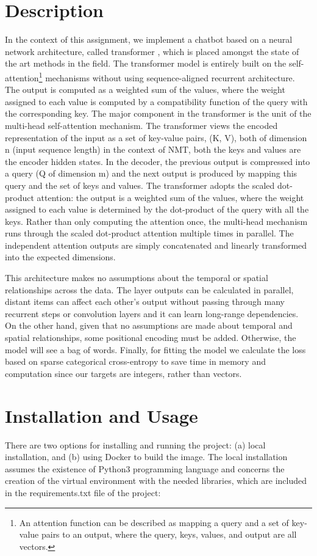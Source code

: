 \documentclass[10pt, twocolumn, a4paper]{article}
\begin{document}
\section{Description}
In the context of this assignment, we implement a chatbot based on a neural network architecture, called transformer \cite{Transformer}, which is placed amongst the state of the art methods in the field. The transformer model is entirely built on the self-attention\footnote{An attention function can be described as mapping a query and a set of key-value pairs to an output, where the query, keys, values, and output are all vectors.} mechanisms without using sequence-aligned recurrent architecture. The output is computed as a weighted sum of the values, where the weight assigned to each value is computed by a compatibility function of the query with the corresponding key. The major component in the transformer is the unit of the multi-head self-attention mechanism. The transformer views the encoded representation of the input as a set of key-value pairs, (K, V), both of dimension n (input sequence length) in the context of NMT, both the keys and values are the encoder hidden states. In the decoder, the previous output is compressed into a query (Q of dimension m) and the next output is produced by mapping this query and the set of keys and values. The transformer adopts the scaled dot-product attention: the output is a weighted sum of the values, where the weight assigned to each value is determined by the dot-product of the query with all the keys. Rather than only computing the attention once, the multi-head mechanism runs through the scaled dot-product attention multiple times in parallel. The independent attention outputs are simply concatenated and linearly transformed into the expected dimensions.

This architecture makes no assumptions about the temporal or spatial relationships across the data. The layer outputs can be calculated in parallel, distant items can affect each other’s output without passing through many recurrent steps or convolution layers and it can learn long-range dependencies. On the other hand, given that no assumptions are made about temporal and spatial relationships, some positional encoding must be added. Otherwise, the model will see a bag of words. Finally, for fitting the model we calculate the loss based on sparse categorical cross-entropy to save time in memory and computation since our targets are integers, rather than vectors.

\section{Installation and Usage}
There are two options for installing and running the project: (a) local installation, and (b) using Docker to build the image. The local installation assumes the existence of Python3 programming language and concerns the creation of the virtual environment with the needed libraries, which are included in the requirements.txt file of the project:
\end{document}
